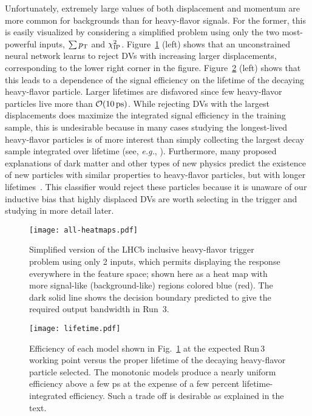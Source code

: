 \documentclass{article}
\begin{document}
Unfortunately, extremely large values of both displacement and momentum are more common for backgrounds than for heavy-flavor signals. 
For the former, this is easily visualized by considering a simplified  problem using only the two most-powerful inputs, $\sum p_{\rm T}$ and $\chi^2_{\rm IP}$. 
Figure~\ref{fig:heatmaps} (left) shows that an unconstrained neural network learns to reject DVs with increasing larger displacements, corresponding to the lower right corner in the figure. 
Figure~\ref{fig:efficiency} (left) shows that this leads to a dependence of the signal efficiency on the lifetime of the decaying heavy-flavor particle. 
Larger lifetimes are disfavored since few heavy-flavor particles live more than $\mathcal{O}(10\,{\rm ps})$. 
While rejecting DVs with the largest displacements does maximize the integrated signal efficiency in the training sample, this is undesirable because in many cases studying the longest-lived heavy-flavor particles is of more interest than simply collecting the largest decay sample integrated over lifetime (see, {\em e.g.}, \cite{HFLAV:2022pwe}). 
Furthermore, many proposed explanations of dark matter and other types of new physics predict the existence of new particles with similar properties to heavy-flavor particles, but with longer lifetimes~\cite{RF6,Graham:2021ggy}. 
This classifier would reject these particles because it is unaware of our inductive bias that highly displaced DVs are worth selecting in the trigger and studying in more detail later. 


\begin{figure}
    \centering
     \texttt{[image: all-heatmaps.pdf]} 
    \caption{Simplified version of the LHCb inclusive heavy-flavor trigger problem using only 2 inputs, which permits displaying the response everywhere in the feature space; shown here as a heat map with more signal-like (background-like) regions colored blue (red). The dark solid line shows the decision boundary predicted to give the required output bandwidth in Run~3.}
    \label{fig:heatmaps}
\end{figure}


\begin{figure}
    \centering
     \texttt{[image: lifetime.pdf]} 
    \caption{Efficiency of each model shown in Fig.~\ref{fig:heatmaps} at the expected Run\,3 working point versus the proper lifetime of the decaying heavy-flavor particle selected. The monotonic models produce a nearly uniform efficiency above a few ps at the expense of a few percent lifetime-integrated efficiency. Such a trade off is desirable as explained in the text.}
    \label{fig:efficiency}
\end{figure}
\end{document}
